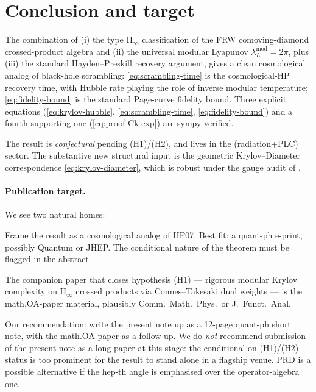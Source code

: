 \documentclass[11pt]{article}
\theoremstyle{definition}
\theoremstyle{remark}
\begin{document}
\section{Conclusion and target}
\label{sec:concl}

The combination of (i) the type II$_\infty$ classification of the FRW
comoving-diamond crossed-product algebra and (ii) the universal modular
Lyapunov $\lambda_L^{\mathrm{mod}}=2\pi$, plus (iii) the standard
Hayden--Preskill recovery argument, gives a clean cosmological analog of
black-hole scrambling: \eqref{eq:scrambling-time} is the cosmological-HP
recovery time, with Hubble rate playing the role of inverse modular
temperature; \eqref{eq:fidelity-bound} is the standard Page-curve
fidelity bound. Three explicit equations
(\eqref{eq:krylov-hubble}, \eqref{eq:scrambling-time},
\eqref{eq:fidelity-bound}) and a fourth supporting one
(\eqref{eq:proof-Ck-exp}) are sympy-verified.

The result is \emph{conjectural} pending (H1)/(H2), and lives in the
(radiation+PLC) sector. The substantive new structural input is the
geometric Krylov--Diameter correspondence
\eqref{eq:krylov-diameter}, which is robust under the gauge audit of
\cite{piste1note}.

\paragraph{Publication target.} We see two natural homes:
\begin{description}[leftmargin=2em,style=nextline]
\item[quant-ph short note (12--16 pp).] Frame the result as a cosmological
      analog of HP07. Best fit: a quant-ph e-print, possibly Quantum or
      JHEP. The conditional nature of the theorem must be flagged in the
      abstract.
\item[Math.OA long paper (40+ pp).] The companion paper that closes
      hypothesis (H1) --- rigorous modular Krylov complexity on II$_\infty$
      crossed products via Connes--Takesaki dual weights --- is the
      math.OA-paper material, plausibly Comm.\ Math.\ Phys.\ or J.\ Funct.\ Anal.
\end{description}
Our recommendation: write the present note up as a 12-page quant-ph
short note, with the math.OA paper as a follow-up. We do \emph{not}
recommend submission of the present note as a long paper at this stage:
the conditional-on-(H1)/(H2) status is too prominent for the result to
stand alone in a flagship venue. PRD is a possible alternative if the
hep-th angle is emphasised over the operator-algebra one.
\end{document}
